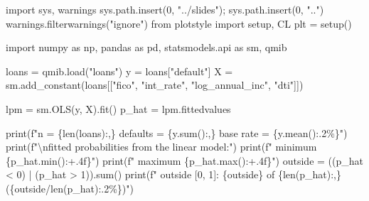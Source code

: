 \documentclass[
  letterpaper,
  10pt,
  twoside,
  openright,
  numbers=noenddot,
  chapterprefix=true]{scrbook}
\newenvironment{Shaded}{}{}
\newcommand{\BuiltInTok}[1]{\textcolor[rgb]{0.84,0.23,0.29}{#1}}
\newcommand{\CharTok}[1]{\textcolor[rgb]{0.01,0.18,0.38}{#1}}
\newcommand{\DecValTok}[1]{\textcolor[rgb]{0.00,0.36,0.77}{#1}}
\newcommand{\ImportTok}[1]{\textcolor[rgb]{0.01,0.18,0.38}{#1}}
\newcommand{\NormalTok}[1]{\textcolor[rgb]{0.14,0.16,0.18}{#1}}
\newcommand{\OperatorTok}[1]{\textcolor[rgb]{0.14,0.16,0.18}{#1}}
\newcommand{\SpecialCharTok}[1]{\textcolor[rgb]{0.00,0.36,0.77}{#1}}
\newcommand{\SpecialStringTok}[1]{\textcolor[rgb]{0.01,0.18,0.38}{#1}}
\newcommand{\StringTok}[1]{\textcolor[rgb]{0.01,0.18,0.38}{#1}}
\begin{document}
\label{check-lpm}
\begin{Shaded}
\begin{Highlighting}[]
\ImportTok{import}\NormalTok{ sys, warnings}
\NormalTok{sys.path.insert(}\DecValTok{0}\NormalTok{, }\StringTok{"../slides"}\NormalTok{)}\OperatorTok{;}\NormalTok{ sys.path.insert(}\DecValTok{0}\NormalTok{, }\StringTok{".."}\NormalTok{)}
\NormalTok{warnings.filterwarnings(}\StringTok{"ignore"}\NormalTok{)}
\ImportTok{from}\NormalTok{ plotstyle }\ImportTok{import}\NormalTok{ setup, CL}
\NormalTok{plt }\OperatorTok{=}\NormalTok{ setup()}

\ImportTok{import}\NormalTok{ numpy }\ImportTok{as}\NormalTok{ np, pandas }\ImportTok{as}\NormalTok{ pd, statsmodels.api }\ImportTok{as}\NormalTok{ sm, qmib}

\NormalTok{loans }\OperatorTok{=}\NormalTok{ qmib.load(}\StringTok{"loans"}\NormalTok{)}
\NormalTok{y }\OperatorTok{=}\NormalTok{ loans[}\StringTok{"default"}\NormalTok{]}
\NormalTok{X }\OperatorTok{=}\NormalTok{ sm.add\_constant(loans[[}\StringTok{"fico"}\NormalTok{, }\StringTok{"int\_rate"}\NormalTok{, }\StringTok{"log\_annual\_inc"}\NormalTok{, }\StringTok{"dti"}\NormalTok{]])}

\NormalTok{lpm }\OperatorTok{=}\NormalTok{ sm.OLS(y, X).fit()}
\NormalTok{p\_hat }\OperatorTok{=}\NormalTok{ lpm.fittedvalues}

\BuiltInTok{print}\NormalTok{(}\SpecialStringTok{f"n = }\SpecialCharTok{\{}\BuiltInTok{len}\NormalTok{(loans)}\SpecialCharTok{:,\}}\SpecialStringTok{   defaults = }\SpecialCharTok{\{}\NormalTok{y}\SpecialCharTok{.}\BuiltInTok{sum}\NormalTok{()}\SpecialCharTok{:,\}}\SpecialStringTok{   base rate = }\SpecialCharTok{\{}\NormalTok{y}\SpecialCharTok{.}\NormalTok{mean()}\SpecialCharTok{:.2\%\}}\SpecialStringTok{"}\NormalTok{)}
\BuiltInTok{print}\NormalTok{(}\SpecialStringTok{f"}\CharTok{\textbackslash{}n}\SpecialStringTok{fitted probabilities from the linear model:"}\NormalTok{)}
\BuiltInTok{print}\NormalTok{(}\SpecialStringTok{f"  minimum }\SpecialCharTok{\{}\NormalTok{p\_hat}\SpecialCharTok{.}\BuiltInTok{min}\NormalTok{()}\SpecialCharTok{:+.4f\}}\SpecialStringTok{"}\NormalTok{)}
\BuiltInTok{print}\NormalTok{(}\SpecialStringTok{f"  maximum }\SpecialCharTok{\{}\NormalTok{p\_hat}\SpecialCharTok{.}\BuiltInTok{max}\NormalTok{()}\SpecialCharTok{:+.4f\}}\SpecialStringTok{"}\NormalTok{)}
\NormalTok{outside }\OperatorTok{=}\NormalTok{ ((p\_hat }\OperatorTok{\textless{}} \DecValTok{0}\NormalTok{) }\OperatorTok{|}\NormalTok{ (p\_hat }\OperatorTok{\textgreater{}} \DecValTok{1}\NormalTok{)).}\BuiltInTok{sum}\NormalTok{()}
\BuiltInTok{print}\NormalTok{(}\SpecialStringTok{f"  outside [0, 1]: }\SpecialCharTok{\{}\NormalTok{outside}\SpecialCharTok{\}}\SpecialStringTok{ of }\SpecialCharTok{\{}\BuiltInTok{len}\NormalTok{(p\_hat)}\SpecialCharTok{:,\}}\SpecialStringTok{ (}\SpecialCharTok{\{}\NormalTok{outside}\OperatorTok{/}\BuiltInTok{len}\NormalTok{(p\_hat)}\SpecialCharTok{:.2\%\}}\SpecialStringTok{)"}\NormalTok{)}
\end{Highlighting}
\end{Shaded}
\end{document}

